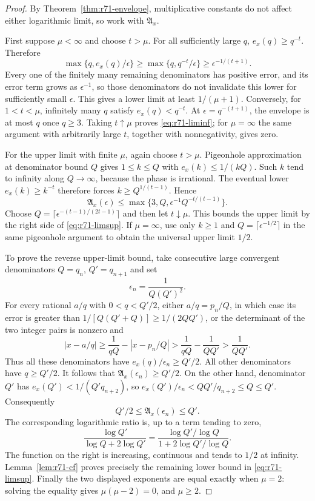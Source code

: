 \begin{proof}
By Theorem~\ref{thm:r71-envelope}, multiplicative constants do not affect either logarithmic limit, so work with $\mathfrak A_x$.

First suppose $\mu<\infty$ and choose $t>\mu$. For all sufficiently large $q$, $e_x(q)\ge q^{-t}$. Therefore
\[
 \max\{q,e_x(q)/\epsilon\}
   \ge\max\{q,q^{-t}/\epsilon\}
   \ge\epsilon^{-1/(t+1)}.
\]
Every one of the finitely many remaining denominators has positive error, and its error term grows as $\epsilon^{-1}$, so those denominators do not invalidate this lower for sufficiently small $\epsilon$. This gives a lower limit at least $1/(\mu+1)$. Conversely, for $1<t<\mu$, infinitely many $q$ satisfy $e_x(q)<q^{-t}$. At $\epsilon=q^{-(t+1)}$, the envelope is at most $q$ once $q\ge3$. Taking $t\uparrow\mu$ proves \eqref{eq:r71-liminf}; for $\mu=\infty$ the same argument with arbitrarily large $t$, together with nonnegativity, gives zero.

For the upper limit with finite $\mu$, again choose $t>\mu$. Pigeonhole approximation at denominator bound $Q$ gives $1\le k\le Q$ with $e_x(k)\le1/(kQ)$. Such $k$ tend to infinity along $Q\to\infty$, because the phase is irrational. The eventual lower $e_x(k)\ge k^{-t}$ therefore forces $k\ge Q^{1/(t-1)}$. Hence
\[
 \mathfrak A_x(\epsilon)
 \le\max\{3,Q,\epsilon^{-1}Q^{-t/(t-1)}\}.
\]
Choose $Q=\lceil\epsilon^{-(t-1)/(2t-1)}\rceil$ and then let $t\downarrow\mu$. This bounds the upper limit by the right side of \eqref{eq:r71-limsup}. If $\mu=\infty$, use only $k\ge1$ and $Q=\lceil\epsilon^{-1/2}\rceil$ in the same pigeonhole argument to obtain the universal upper limit $1/2$.

To prove the reverse upper-limit bound, take consecutive large convergent denominators $Q=q_n$, $Q'=q_{n+1}$ and set
\begin{equation}\label{eq:r71-crossover}
 \epsilon_n=\frac1{Q(Q')^2}.
\end{equation}
For every rational $a/q$ with $0<q<Q'/2$, either $a/q=p_n/Q$, in which case its error is greater than $1/[Q(Q'+Q)]\ge1/(2QQ')$, or the determinant of the two integer pairs is nonzero and
\[
 |x-a/q|\ge\frac1{qQ}-|x-p_n/Q|
          >\frac1{qQ}-\frac1{QQ'}>\frac1{QQ'}.
\]
Thus all these denominators have $e_x(q)/\epsilon_n\ge Q'/2$. All other denominators have $q\ge Q'/2$. It follows that $\mathfrak A_x(\epsilon_n)\ge Q'/2$. On the other hand, denominator $Q'$ has
$e_x(Q')<1/(Q'q_{n+2})$, so
$e_x(Q')/\epsilon_n<Q Q'/q_{n+2}\le Q\le Q'$.
Consequently
\begin{equation}\label{eq:r71-crossover-envelope}
 Q'/2\le\mathfrak A_x(\epsilon_n)\le Q'.
\end{equation}
The corresponding logarithmic ratio is, up to a term tending to zero,
\[
 \frac{\log Q'}{\log Q+2\log Q'}
   =\frac{\log Q'/\log Q}{1+2\log Q'/\log Q}.
\]
The function on the right is increasing, continuous and tends to $1/2$ at infinity. Lemma~\ref{lem:r71-cf} proves precisely the remaining lower bound in \eqref{eq:r71-limsup}. Finally the two displayed exponents are equal exactly when $\mu=2$: solving the equality gives $\mu(\mu-2)=0$, and $\mu\ge2$.
\end{proof}

